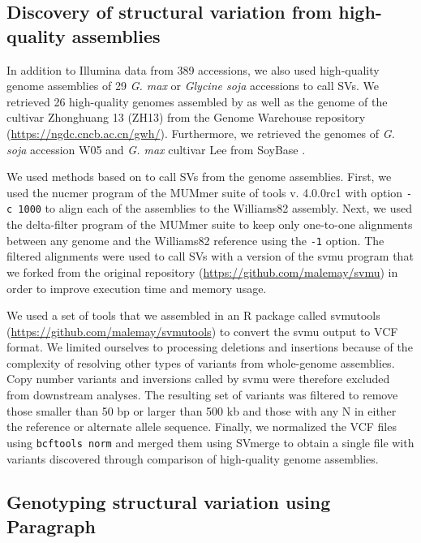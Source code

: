 \documentclass[12pt]{article}
\begin{document}
\subsection*{Discovery of structural variation from high-quality assemblies}
\label{sv-gwas-sv-discovery-assembly}

In addition to Illumina data from 389 accessions, we also used
high-quality genome assemblies of 29 \emph{G. max} or \emph{Glycine soja}
accessions to call SVs. We
retrieved 26 high-quality genomes assembled by  as well
as the genome of the cultivar Zhonghuang 13 (ZH13) from the Genome Warehouse
repository (\url{https://ngdc.cncb.ac.cn/gwh/}). Furthermore, we retrieved the genomes
of \emph{G. soja} accession W05 and \emph{G. max} cultivar Lee from SoyBase
.

We used methods based on  to call SVs from the
genome assemblies.  First, we used the nucmer program of the MUMmer suite of
tools v. 4.0.0rc1  with option \texttt{-c 1000} to align
each of the assemblies to the Williams82 assembly. Next, we used the
delta-filter program of the MUMmer suite to keep only one-to-one alignments
between any genome and the Williams82 reference using the \texttt{-1} option.
The filtered alignments were used to call SVs with a version of the svmu
program  that we forked from the original repository
(\url{https://github.com/malemay/svmu}) in order to improve execution time and
memory usage.

We used a set of tools that we assembled in an R package called svmutools
(\url{https://github.com/malemay/svmutools}) to convert the svmu output to VCF
format. We limited ourselves to processing deletions and insertions because of
the complexity of resolving other types of variants from whole-genome
assemblies.  Copy number variants and inversions called by svmu were therefore
excluded from downstream analyses. The
resulting set of variants was filtered to remove those smaller than 50 bp or larger than 500
kb and those with any N in either the reference or alternate allele sequence.
Finally, we normalized the VCF files using \texttt{bcftools norm} and merged
them using SVmerge to obtain a single file with variants discovered through
comparison of high-quality genome assemblies.

\subsection*{Genotyping structural variation using Paragraph}
\label{sv-gwas-sv-genotyping-paragraph}
\end{document}
